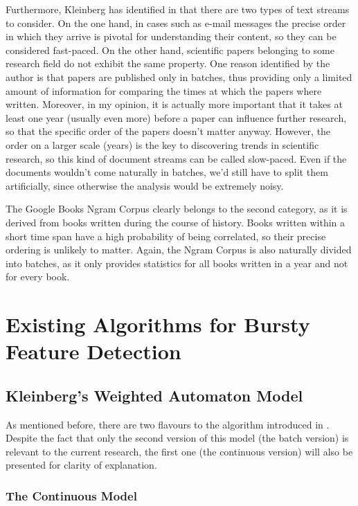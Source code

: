 Furthermore, Kleinberg has identified in \cite{Kleinberg:2002:BHS:775047.775061} that there are two types of text streams to consider. On the one hand, in cases such as e-mail messages the precise order in which they arrive is pivotal for understanding their content, so they can be considered fast-paced. On the other hand, scientific papers belonging to some research field do not exhibit the same property. One reason identified by the author is that papers are published only in batches, thus providing only a limited amount of information for comparing the times at which the papers where written. Moreover, in my opinion, it is actually more important that it takes at least one year (usually even more) before a paper can influence further research, so that the specific order of the papers doesn't matter anyway. However, the order on a larger scale (years) is the key to discovering trends in scientific research, so this kind of document streams can be called slow-paced. Even if the documents wouldn't come naturally in batches, we'd still have to split them artificially, since otherwise the analysis would be extremely noisy.

The Google Books Ngram Corpus clearly belongs to the second category, as it is derived from books written during the course of history. Books written within a short time span have a high probability of being correlated, so their precise ordering is unlikely to matter. Again, the Ngram Corpus is also naturally divided into batches, as it only provides statistics for all books written in a year and not for every book.

\section{Existing Algorithms for Bursty Feature Detection}
\label{sec:bf-existing-algorithms}

\subsection{Kleinberg's Weighted Automaton Model}
\label{subsec:bf-kleinberg}

As mentioned before, there are two flavours to the algorithm introduced in \cite{Kleinberg:2002:BHS:775047.775061}. Despite the fact that only the second version of this model (the batch version) is relevant to the current research, the first one (the continuous version) will also be presented for clarity of explanation.

\subsubsection{The Continuous Model}

